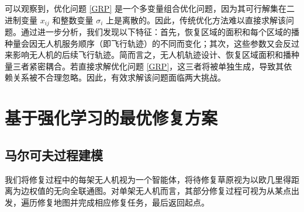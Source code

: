 \documentclass[AutoFakeBold]{LZUThesis}
\begin{document}
可以观察到，优化问题 \eqref{GRP} 是一个多变量组合优化问题，因为其可行解集在二进制变量 $x_{ij}$ 和整数变量 $\sigma_i$ 上是离散的。因此，传统优化方法难以直接求解该问题。通过进一步分析，我们发现以下特征：首先，恢复区域的面积和每个区域的播种量会因无人机服务顺序（即飞行轨迹）的不同而变化；其次，这些参数又会反过来影响无人机的后续飞行轨迹。简而言之，无人机轨迹设计、恢复区域面积和播种量三者紧密耦合。若直接求解优化问题 \eqref{GRP}，这三者将被单独生成，导致其依赖关系被不合理忽略。因此，有效求解该问题面临两大挑战。





\chapter{基于强化学习的最优修复方案}

\section{马尔可夫过程建模}
我们将修复过程中的每架无人机视为一个智能体，将待修复草原视为以欧几里得距离为边权值的无向全联通图。对单架无人机而言，其部分修复过程可视为从某点出发，遍历修复地图并完成相应修复任务，最后返回起点。
\end{document}
